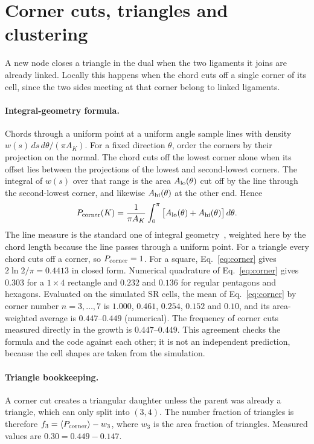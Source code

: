 \documentclass[pre,twocolumn,superscriptaddress,amsmath,amssymb,floatfix]{revtex4-2}
\begin{document}
\section{Corner cuts, triangles and clustering}
\label{sec:triangles}

A new node closes a triangle in the dual when the two ligaments it joins are already
linked. Locally this happens when the chord cuts off a single corner of its cell,
since the two sides meeting at that corner belong to linked ligaments.

\paragraph*{Integral-geometry formula.}
Chords through a uniform point at a uniform angle sample lines with density
$w(s)\,ds\,d\theta/(\pi A_K)$. For a fixed direction $\theta$, order the corners by
their projection on the normal. The chord cuts off the lowest corner alone when its
offset lies between the projections of the lowest and second-lowest corners. The
integral of $w(s)$ over that range is the area $A_{\rm lo}(\theta)$ cut off by the line
through the second-lowest corner, and likewise $A_{\rm hi}(\theta)$ at the other end.
Hence
\begin{equation}
  P_{\rm corner}(K)=\frac{1}{\pi A_K}\int_0^\pi\big[A_{\rm lo}(\theta)+A_{\rm hi}(\theta)\big]\,d\theta .
  \label{eq:corner}
\end{equation}
The line measure is the standard one of integral geometry~\cite{santalo1976}, weighted
here by the chord length because the line passes through a uniform point. For a
triangle every chord cuts off a corner, so $P_{\rm corner}=1$. For a square,
Eq.~\eqref{eq:corner} gives $2\ln2/\pi=0.4413$ in closed form. Numerical quadrature of
Eq.~\eqref{eq:corner} gives $0.303$ for a $1\times4$ rectangle and $0.232$ and $0.136$ for
regular pentagons and hexagons. Evaluated on the simulated SR cells, the mean of
Eq.~\eqref{eq:corner} by corner number $n=3,\dots,7$ is $1.000$, $0.461$, $0.254$,
$0.152$ and $0.10$, and its area-weighted average is $0.447$--$0.449$ (numerical). The
frequency of corner cuts measured directly in the growth is $0.447$--$0.449$. This
agreement checks the formula and the code against each other; it is not an
independent prediction, because the cell shapes are taken from the simulation.

\paragraph*{Triangle bookkeeping.}
A corner cut creates a triangular daughter unless the parent was already a
triangle, which can only split into $(3,4)$. The number fraction of triangles is
therefore $f_3=\langle P_{\rm corner}\rangle-w_3$, where $w_3$ is the area fraction of
triangles. Measured values are $0.30=0.449-0.147$.
\end{document}
